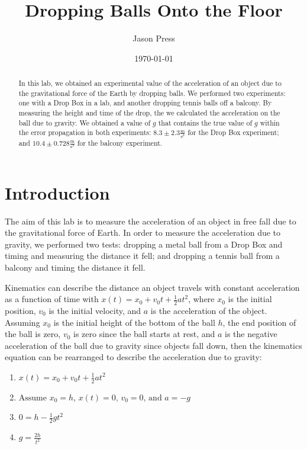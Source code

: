 \documentclass[12pt]{article}
\author{Jason Press}
\date{\today}
\title{Dropping Balls Onto the Floor}
\begin{document}
\maketitle
\begin{abstract}


In this lab, we obtained an experimental value of the acceleration of an object due to the gravitational force of the Earth by dropping balls. We performed two experiments: one with a Drop Box in a lab, and another dropping tennis balls off a balcony. By measuring the height and time of the drop, the we calculated the acceleration on the ball due to gravity. We obtained a value of \(g\) that contains the true value of \(g\) within the error propagation in both experiments:  \(8.3\pm2.3 \frac{\text{m}}{\text{s}^{2}}\) for the Drop Box experiment; and \(10.4\pm 0.728 \frac{\text{m}}{\text{s}^{2}}\) for the balcony experiment.
\end{abstract}
\section{Introduction}
\label{sec:org09312ae}

The aim of this lab is to measure the acceleration of an object in free fall due to the gravitational force of Earth. In order to measure the acceleration due to gravity, we performed two tests: dropping a metal ball from a Drop Box and timing and measuring the distance it fell; and dropping a tennis ball from a balcony and timing the distance it fell.

Kinematics can describe the distance an object travels with constant acceleration as a function of time with \(x\left(t\right) = x_{0} + v_{0}t + \frac{1}{2}at^{2}\), where \(x_{0}\) is the initial position, \(v_{0}\) is the initial velocity, and \(a\) is the acceleration of the object. Assuming \(x_{0}\) is the initial height of the bottom of the ball \(h\), the end position of the ball is zero, \(v_{0}\) is zero since the ball starts at rest, and \(a\) is the negative acceleration of the ball due to gravity since objects fall down, then the kinematics equation can be rearranged to describe the acceleration due to gravity:

\begin{enumerate}
\item \(x(t) = x_{0} + v_{0}t + \frac{1}{2}at^{2} \)
\item \( \text{Assume } x_{0} = h \text{, } x(t) = 0 \text{, } v_{0} = 0 \text{, and } a = -g \)
\item \(0 = h - \frac{1}{2} gt^{2} \)
\item \(g = \frac{2h}{t^{2}} \)
\end{enumerate}
\end{document}
